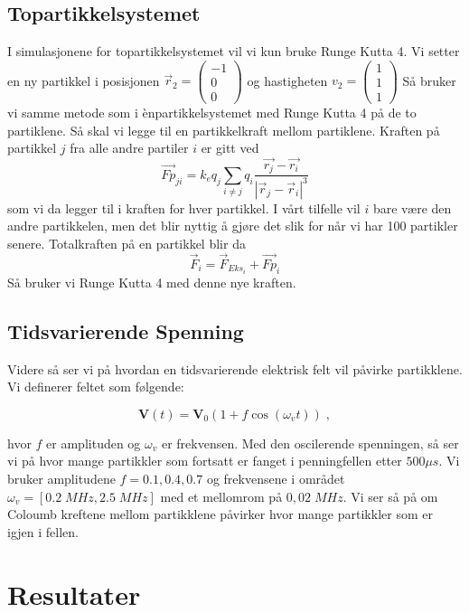 \documentclass[reprint,english,notitlepage, nofootinbib]{revtex4-1}  %
\begin{document}
\subsection*{Topartikkelsystemet}
I simulasjonene for topartikkelsystemet vil vi kun bruke Runge Kutta 4. Vi setter en ny partikkel i posisjonen $\vec{r}_2=\begin{pmatrix}
-1\\0\\0
\end{pmatrix}
$ og hastigheten $v_2=\begin{pmatrix}
1\\1\\1
\end{pmatrix}$
\newline Så bruker vi samme metode som i ènpartikkelsystemet med Runge Kutta 4 på de to partiklene.
\newline  Så skal vi legge til en partikkelkraft mellom partiklene. Kraften på partikkel $j$ fra alle andre partiler $i$ er gitt ved
$$
\vec{Fp}_{ji}=k_e q_j \sum_{i\neq j} q_i \frac{\vec{r_j}-\vec{r_i}}{|\vec{r}_j-\vec{r}_i|^3}
$$
som vi da legger til i kraften for hver partikkel. I vårt tilfelle vil $i$ bare være den andre partikkelen, men det blir nyttig å gjøre det slik for når vi har 100 partikler senere. Totalkraften på en partikkel blir da
$$
\vec{F}_i=\vec{F}_{Eks_i}+\vec{Fp}_i
$$
Så bruker vi Runge Kutta 4 med denne nye kraften.

\subsection*{Tidsvarierende Spenning}

Videre så ser vi på hvordan en tidsvarierende elektrisk felt vil påvirke partikklene. Vi definerer feltet som følgende:

\begin{equation}\label{Vt}
\mathbf{V}(t)=\mathbf{V}_0(1+f\cos{(\omega_vt)}) \; ,
\end{equation}

hvor $f$ er amplituden og $\omega_v$ er frekvensen. Med den oscilerende spenningen, så ser vi på hvor mange partikkler som fortsatt er fanget i penningfellen etter $500 \mu s$. Vi bruker amplitudene $f = {0.1, 0.4, 0.7}$ og frekvensene i området $\omega_v = \left [0.2 \; MHz, 2.5 \; MHz \right ]$ med et mellomrom på $0,02 \; MHz$. Vi ser så på om Coloumb kreftene mellom partikklene påvirker hvor mange partikkler som er igjen i fellen.

\section{Resultater}
\end{document}
